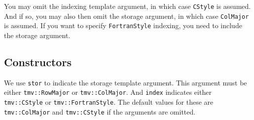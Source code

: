 \documentclass[twoside,letterpaper,11pt]{article}
\renewcommand{\tt}[1]{{\lstinline {#1}}}
\begin{document}
You may omit the indexing template argument, in which case \tt{CStyle} is assumed.
And if so, you may also then omit the storage argument, in which case \tt{ColMajor}
is assumed.  If you want to specify \tt{FortranStyle} indexing, you need
to include the storage argument.

\subsection{Constructors}

We use \tt{stor} to indicate the storage template argument. 
This argument must be either 
\tt{tmv::RowMajor} or \tt{tmv::ColMajor}.  And \tt{index} indicates either 
\tt{tmv::CStyle} or \tt{tmv::FortranStyle}.  The default values for these
are \tt{tmv::ColMajor} and \tt{tmv::CStyle} if the arguments are omitted.
\end{document}
